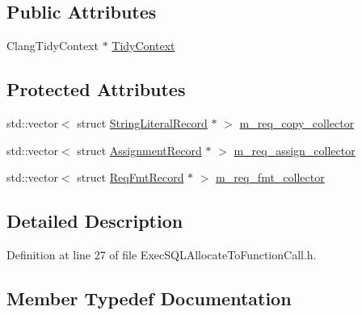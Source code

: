 \subsection*{Public Attributes}
\begin{DoxyCompactItemize}
\item 
Clang\+Tidy\+Context $\ast$ \hyperlink{classclang_1_1tidy_1_1pagesjaunes_1_1_exec_s_q_l_allocate_to_function_call_a3c98610a036c1af3e05dabd693d11c3c}{Tidy\+Context}
\end{DoxyCompactItemize}
\subsection*{Protected Attributes}
\begin{DoxyCompactItemize}
\item 
std\+::vector$<$ struct \hyperlink{structclang_1_1tidy_1_1pagesjaunes_1_1_exec_s_q_l_allocate_to_function_call_1_1_string_literal_record}{String\+Literal\+Record} $\ast$ $>$ \hyperlink{classclang_1_1tidy_1_1pagesjaunes_1_1_exec_s_q_l_allocate_to_function_call_adc4e41d64bf282e5dc390672f099e5bc}{m\+\_\+req\+\_\+copy\+\_\+collector}
\item 
std\+::vector$<$ struct \hyperlink{structclang_1_1tidy_1_1pagesjaunes_1_1_exec_s_q_l_allocate_to_function_call_1_1_assignment_record}{Assignment\+Record} $\ast$ $>$ \hyperlink{classclang_1_1tidy_1_1pagesjaunes_1_1_exec_s_q_l_allocate_to_function_call_af762cc2c9d3906e66d6a73102fcafae7}{m\+\_\+req\+\_\+assign\+\_\+collector}
\item 
std\+::vector$<$ struct \hyperlink{structclang_1_1tidy_1_1pagesjaunes_1_1_exec_s_q_l_allocate_to_function_call_1_1_req_fmt_record}{Req\+Fmt\+Record} $\ast$ $>$ \hyperlink{classclang_1_1tidy_1_1pagesjaunes_1_1_exec_s_q_l_allocate_to_function_call_a3198aa26d43a7d7674f8b3bab2589062}{m\+\_\+req\+\_\+fmt\+\_\+collector}
\end{DoxyCompactItemize}


\subsection{Detailed Description}


Definition at line 27 of file Exec\+S\+Q\+L\+Allocate\+To\+Function\+Call.\+h.



\subsection{Member Typedef Documentation}
\mbox{\label{classclang_1_1tidy_1_1pagesjaunes_1_1_exec_s_q_l_allocate_to_function_call_adcae58fbc0cce6f6c8ada7fea6a8e7f1}} 

